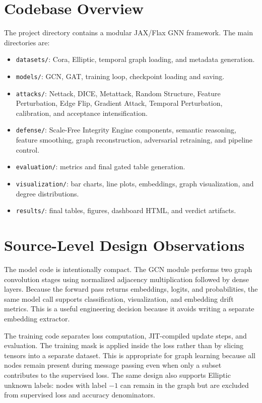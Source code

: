 \documentclass[12pt,oneside]{report}
\begin{document}
\section{Codebase Overview}
The project directory contains a modular JAX/Flax GNN framework. The main directories are:
\begin{itemize}
    \item \texttt{datasets/}: Cora, Elliptic, temporal graph loading, and metadata generation.
    \item \texttt{models/}: GCN, GAT, training loop, checkpoint loading and saving.
    \item \texttt{attacks/}: Nettack, DICE, Metattack, Random Structure, Feature Perturbation, Edge Flip, Gradient Attack, Temporal Perturbation, calibration, and acceptance intensification.
    \item \texttt{defense/}: Scale-Free Integrity Engine components, semantic reasoning, feature smoothing, graph reconstruction, adversarial retraining, and pipeline control.
    \item \texttt{evaluation/}: metrics and final gated table generation.
    \item \texttt{visualization/}: bar charts, line plots, embeddings, graph visualization, and degree distributions.
    \item \texttt{results/}: final tables, figures, dashboard HTML, and verdict artifacts.
\end{itemize}

\section{Source-Level Design Observations}
The model code is intentionally compact. The GCN module performs two graph convolution stages using normalized adjacency multiplication followed by dense layers. Because the forward pass returns embeddings, logits, and probabilities, the same model call supports classification, visualization, and embedding drift metrics. This is a useful engineering decision because it avoids writing a separate embedding extractor.

The training code separates loss computation, JIT-compiled update steps, and evaluation. The training mask is applied inside the loss rather than by slicing tensors into a separate dataset. This is appropriate for graph learning because all nodes remain present during message passing even when only a subset contributes to the supervised loss. The same design also supports Elliptic unknown labels: nodes with label \(-1\) can remain in the graph but are excluded from supervised loss and accuracy denominators.
\end{document}
